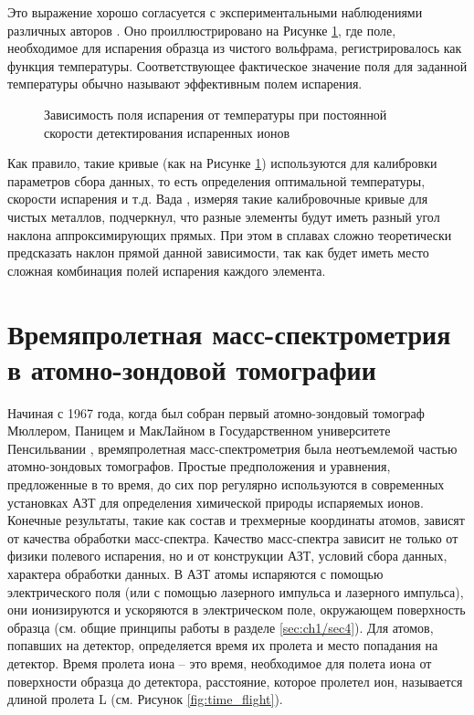 Это выражение хорошо согласуется с экспериментальными наблюдениями различных авторов \cite{Kellogg84,Kellogg81,Wada84,Kellogg80,Vurpillot06}. Оно проиллюстрировано на Рисунке  \cref{fig:field_temp}, где поле, необходимое для испарения образца из чистого вольфрама, регистрировалось как функция температуры. Соответствующее фактическое значение поля для заданной температуры обычно называют эффективным полем испарения.

\begin{figure}[tb]
	\caption{Зависимость поля испарения от температуры при постоянной скорости детектирования испаренных ионов \cite{Vurpillot06}}
	\label{fig:field_temp}
\end{figure} 

\FloatBarrier


Как правило, такие кривые (как на Рисунке \cref{fig:field_temp}) используются для калибровки параметров сбора данных, то есть определения оптимальной температуры, скорости испарения и т.д. Вада \cite{Wada84}, измеряя такие калибровочные кривые для чистых металлов, подчеркнул, что разные элементы будут иметь разный угол наклона аппроксимирующих прямых. При этом в сплавах сложно теоретически предсказать наклон прямой данной зависимости, так как будет иметь место сложная комбинация полей испарения каждого элемента.

\FloatBarrier

\section{Времяпролетная масс-спектрометрия в атомно-зондовой томографии}\label{sec:ch1/sec2}

Начиная с  1967 года, когда был собран первый атомно-зондовый томограф Мюллером, Паницем и МакЛайном в Государственном университете Пенсильвании \cite{Muller68},  времяпролетная масс-спектрометрия была неотъемлемой частью атомно-зондовых томографов. Простые предположения и уравнения, предложенные в то время, до сих пор регулярно используются в современных установках АЗТ для определения химической природы испаряемых ионов. Конечные результаты, такие как состав и трехмерные координаты атомов, зависят от качества обработки масс-спектра.
Качество масс-спектра зависит не только от физики полевого испарения, но и от конструкции АЗТ, условий сбора данных, характера обработки данных. В АЗТ атомы испаряются с помощью электрического поля (или с помощью лазерного импульса и лазерного импульса), они ионизируются и ускоряются в электрическом поле, окружающем поверхность образца (см. общие принципы работы в разделе \cref{sec:ch1/sec4}). Для атомов, попавших на детектор, определяется время их пролета и место попадания на детектор. Время пролета иона – это время, необходимое для полета иона от поверхности образца до детектора, расстояние, которое пролетел ион, называется длиной пролета L (см. Рисунок \cref{fig:time_flight}). 

